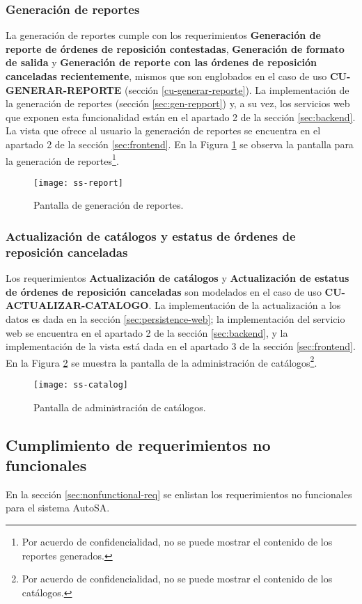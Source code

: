 \subsubsection{Generación de reportes}
La generación de reportes cumple con los requerimientos \textbf{Generación de reporte de órdenes de reposición contestadas}, \textbf{Generación de formato de salida} y \textbf{Generación de reporte con las órdenes de reposición canceladas recientemente}, mismos que son englobados en el caso de uso \textbf{CU-GENERAR-REPORTE} (sección \ref{cu-generar-reporte}). La implementación de la generación de reportes (sección \ref{sec:gen-repport}) y, a su vez, los servicios web que exponen esta funcionalidad están en el apartado 2 de la sección \ref{sec:backend}. La vista que ofrece al usuario la generación de reportes se encuentra en el apartado 2 de la sección \ref{sec:frontend}. En la Figura \ref{fig:ss-report} se observa la pantalla para la generación de reportes\footnote{Por acuerdo de confidencialidad, no se puede mostrar el contenido de los reportes generados.}. 
	\begin{figure}[h]
		\centering
		\texttt{[image: ss-report]}
		\caption{Pantalla de generación de reportes.}
		\label{fig:ss-report}
	\end{figure}

\subsubsection{Actualización de catálogos y estatus de órdenes de reposición canceladas}
Los requerimientos \textbf{Actualización de catálogos} y \textbf{Actualización de estatus de órdenes de reposición canceladas} son modelados en el caso de uso \textbf{CU-ACTUALIZAR-CATALOGO}. La implementación de la actualización a los datos es dada en la sección \ref{sec:persistence-web}; la implementación del servicio web se encuentra en el apartado 2 de la sección \ref{sec:backend}, y la implementación de la vista está dada en el apartado 3 de la sección \ref{sec:frontend}. En la Figura \ref{fig:ss-catalog} se muestra la pantalla de la administración de catálogos\footnote{Por acuerdo de confidencialidad, no se puede mostrar el contenido de los catálogos.}.
\begin{figure}[h]
	\centering
	\texttt{[image: ss-catalog]}
	\caption{Pantalla de administración de catálogos.}
	\label{fig:ss-catalog}
\end{figure}


\subsection{Cumplimiento de requerimientos no funcionales}
En la sección \ref{sec:nonfunctional-req} se enlistan los requerimientos no funcionales para el sistema AutoSA.

